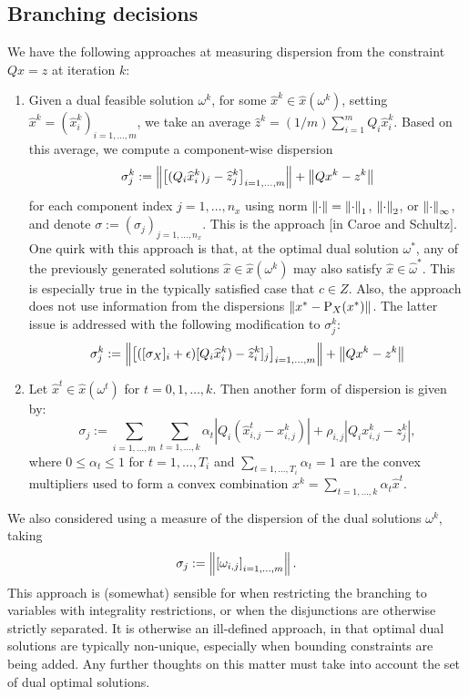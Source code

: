 \subsection{Branching decisions}
We have the following approaches at measuring dispersion from the constraint $Qx=z$ at iteration $k$:
\begin{enumerate}
\item Given a dual feasible solution $\omega^k$, for some $\widehat{x}^k \in \widehat{x}(\omega^k)$, 
setting $\widehat{x}^k=(\widehat{x}_i^k)_{i=1,\dots,m}$, we take an average $\widehat{z}^k = (1/m)\sum_{i=1}^m Q_i\widehat{x}_i^k$. Based on this average,
we compute a component-wise dispersion 
$$\sigma_j^k:=\left \|  \left[(Q_i\widehat{x}_{i}^k)_j - \widehat{z}_j^k\right]_{i=1,\dots,m}  \right \| + \left \| Qx^k-z^k \right \|$$ 
for each component index $j=1,\dots,n_x$ using norm $\left \| \cdot \right \|=\left \| \cdot \right \|_{1}$, $\left \| \cdot \right \|_2$, or $\left \| \cdot \right \|_\infty$, and denote $\sigma:=(\sigma_j)_{j=1,\dots,n_x}$. This is the approach [in Caroe and Schultz]. One quirk with this approach is that, at the optimal dual solution $\omega^*$, any of the previously generated solutions $\widehat{x} \in \widehat{x}(\omega^k)$ may also satisfy $\widehat{x} \in \widehat{\omega}^*$. This is especially true in the typically satisfied case that $c \in Z$. Also, the approach does not use information from the dispersions $\left \| x^* - \text{P}_X(x^*) \right \|$. The latter issue is addressed with the following modification to $\sigma_j^k$:
$$
\sigma_j^k:=\left \|  \left[([\sigma_X]_i+\epsilon)[Q_i\widehat{x}_{i}^k) - \widehat{z}_i^k]_j\right]_{i=1,\dots,m}  \right \| + \left \| Qx^k-z^k \right \|
$$
\item Let $\widehat{x}^t \in \widehat{x}(\omega^t)$ for $t=0,1,\dots,k$. Then another form of dispersion is given by:
$$ \sigma_j := \sum_{i=1,\dots,m} \sum_{t=1,\dots,k} \alpha_t \left|Q_i\left( \widehat{x}_{i,j}^t - x_{i,j}^k \right) \right| + \rho_{i,j}\left| Q_i x_{i,j}^k - z_j^k \right|, $$
where $0 \le \alpha_t \le 1$ for $t=1,\dots,T_i$ and $\sum_{t=1,\dots,T_i} \alpha_t = 1$ are the convex multipliers used to form a convex combination $x^k = \sum_{t=1,\dots,k} \alpha_t\widehat{x}^t$.
\end{enumerate}

\begin{remark}
We also considered using a measure of the dispersion of the dual solutions $\omega^k$, taking
$$
\sigma_j := \left \| \left[\omega_{i,j}\right]_{i=1,\dots,m} \right \|.
$$
This approach is (somewhat) sensible for when restricting the branching to variables with integrality restrictions, or when the disjunctions are otherwise strictly separated. It is otherwise an ill-defined approach, in that optimal dual solutions are typically non-unique, especially when bounding constraints are being added. Any further thoughts on this matter must take into account the set of dual optimal solutions.
\end{remark}

